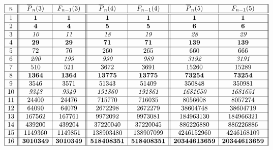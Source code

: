 \documentclass[11pt, a4paper]{amsart}
\theoremstyle{definition}
\newcommand\Pg{\overline{P}}
\numberwithin{equation}{section}
\begin{document}
\begin{table}[ht]
\caption{\emph{Values of $\Pg_n(N)$ and $F_{n-1}(N)$ for $N = 3,4,5$}}\label{table-values}
\renewcommand\arraystretch{1.30}
\noindent\[\hskip -14pt
\begin{array}{|c||c|c||c|c||c|c||}
\hline
n &  \Pg_n(3) & F_{n-1}(3) &  \Pg_n(4) & F_{n-1}(4) & \Pg_n(5) & F_{n-1}(5) \\
\hline\hline
{1}  & \textbf{1} &  \textbf{1} &\textbf{1}  & \textbf{1}  & \textbf{1} & \textbf{1}\\ 
\hline
{2} &  \textbf{4} & \textbf{4} & \textbf{5} & \textbf{5} & \textbf{6}  & \textbf{6} \\
\hline
3 &  \textit{10} & \textit{11} &  \textit{18} & \textit{19} & \textit{28} & \textit{29} \\ 
\hline
{4} &  \textbf{29}  & \textbf{29}  & \textbf{71} & \textbf{71} & \textbf{139} & \textbf{139}  \\ 
\hline
5 &   72 & 76 & 260 & 265 & 660 & 666\\ 
\hline
6 &    \textit{200} &  \textit{199} & \textit{990} & \textit{989} & \textit{3192} & \textit{3191}  \\
\hline
7 &  510  & 521  &  3672 & 3691 & 15260 & 15289 \\ 
\hline
{8} &  \textbf{1364} & \textbf{1364} & \textbf{13775} & \textbf{13775} & \textbf{73254} & \textbf{73254} \\ 
\hline
9 &  3546  & 3571  & 51343 & 51409 & 350848 &  350981 \\
\hline
10 &  \textit{9348}  &  \textit{9349}  & \textit{191860} & \textit{191861} & \textit{1681650} & \textit{1681651}  \\
\hline
11 &  24400  & 24476  & 715770 & 716035 & 8056608 & 8057274 \\
\hline
12 &  64090 & 64079 & 2672298 & 2672279 & 38604748 & 38604719 \\
\hline
13 & 167562  & 167761 & 9972092 & 9973081 & 184963130 & 184966321 \\
\hline
14 & 439200  & 439204 & 37220040 & 37220045 &886226880 & 886226886 \\
\hline
15 &  1149360 &1149851  & 138903480 & 138907099 &4246152960 & 4246168109 \\
\hline
{16} & \textbf{3010349} & \textbf{3010349} & \textbf{518408351} & \textbf{518408351} & \textbf{20344613659} & \textbf{20344613659}\\
\hline
\end{array}
\]
\end{table}
\end{document}
